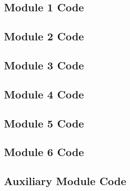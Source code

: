 \documentclass[conf]{new-aiaa} %
\begin{document}

% 

\subsection{Module 1 Code}


% 

\subsection{Module 2 Code}


% 

\subsection{Module 3 Code}


% 

\subsection{Module 4 Code}


% 

\subsection{Module 5 Code}


% 

\subsection{Module 6 Code}


% 

\subsection{Auxiliary Module Code}


% 



\end{document}

